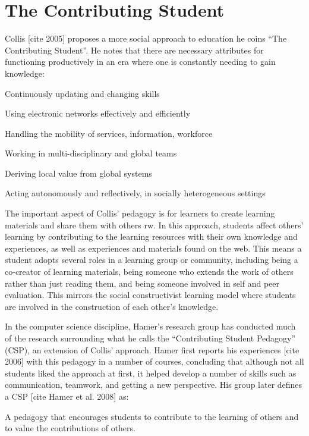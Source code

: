 \section{The Contributing Student}

Collis [cite 2005] proposes a more social approach to education he coins “The Contributing Student”. He notes that there are necessary attributes for functioning productively in an era where one is constantly needing to gain knowledge:

Continuously updating and changing skills

Using electronic networks effectively and efficiently

Handling the mobility of services, information, workforce

Working in multi-disciplinary and global teams

Deriving local value from global systems

Acting autonomously and reflectively, in socially heterogeneous settings

The important aspect of Collis’ pedagogy is for learners to create learning materials and share them with others {rw}. In this approach, students affect others’ learning by contributing to the learning resources with their own knowledge and experiences, as well as experiences and materials found on the web. This means a student adopts several roles in a learning group or community, including being a co-creator of learning materials, being someone who extends the work of others rather than just reading them, and being someone involved in self and peer evaluation. This mirrors the social constructivist learning model where students are involved in the construction of each other’s knowledge.

In the computer science discipline, Hamer’s research group has conducted much of the research surrounding what he calls the “Contributing Student Pedagogy” (CSP), an extension of Collis’ approach. Hamer first reports his experiences [cite 2006] with this pedagogy in a number of courses, concluding that although not all students liked the approach at first, it helped develop a number of skills such as communication, teamwork, and getting a new perspective. His group later defines a CSP [cite Hamer et al. 2008] as:

A pedagogy that encourages students to contribute to the learning of others and to value the contributions of others.

